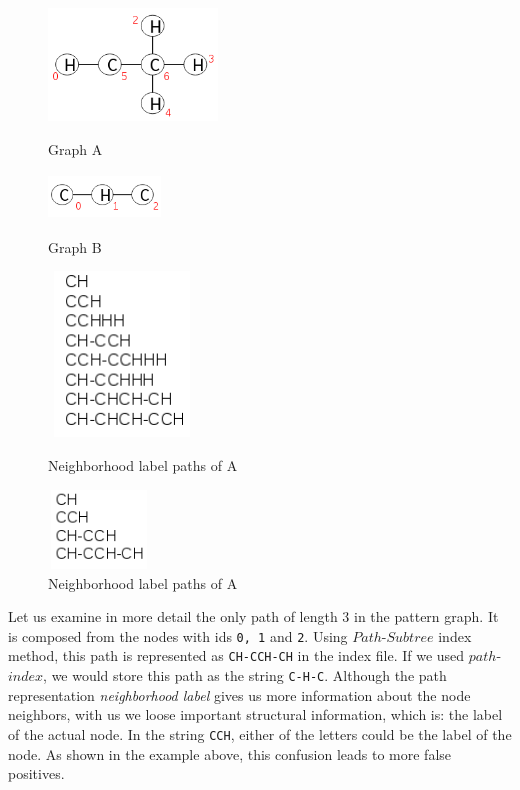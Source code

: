 \documentclass{l4proj}
\theoremstyle{definition}
\begin{document}
\begin{figure}[h]
\centering
\begin{minipage}[t]{.5\textwidth}
  \centering
  \includegraphics[height=3cm,width=4.5cm]{images/graphs/C2H4-1.png}
  \caption{Graph A}
  \label{C2H4-1}
\end{minipage}%
\begin{minipage}[t]{.5\textwidth}
  \centering
  \includegraphics[height=1.2cm,width=3cm]{images/graphs/C2H.png}
  \caption{Graph B}
  \label{C2H}
\end{minipage}%

\begin{minipage}[t]{.5\textwidth}
  \centering
  \includegraphics[height=4.4cm,width=3.9cm]{images/paths/C2H4-1-isomer-paths.png}
  \caption{Neighborhood label paths of A}
  \label{C2H4-1-subtree-label-paths}
\end{minipage}%
\begin{minipage}[t]{.5\textwidth}
  \centering
  \includegraphics[height=2.1cm,width=2.7cm]{images/paths/C2H-isomer-paths.png}
  \caption{Neighborhood label paths of A}
  \label{C2H-subtree-label-paths}
\end{minipage}%
\end{figure}
Let us examine in more detail the only path of length 3 in the pattern graph. It is composed from the nodes with ids \texttt{0, 1} and \texttt{2}. Using $Path$-$Subtree$ index method, this path is represented as \texttt{CH-CCH-CH} in the index file. If we used $path$-$index$, we would store this path as the string \texttt{C-H-C}. Although the path representation \textit{neighborhood label} gives us more information about the node neighbors, with us we loose important structural information, which is: the label of the actual node. In the string \texttt{CCH},  either of the letters could be the label of the node. As shown in the example above, this confusion leads to more false positives.\par
\end{document}
